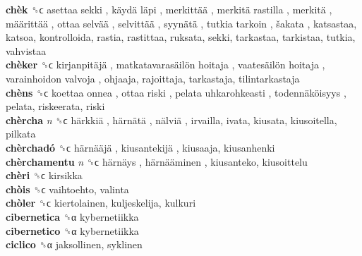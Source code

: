 \textbf{chèk} ␝ϲ   asettaa sekki ,  käydä läpi ,  merkittää ,  merkitä rastilla ,  merkitä ,  määrittää ,  ottaa selvää ,  selvittää ,  syynätä ,  tutkia tarkoin ,  šakata , katsastaa, katsoa, kontrolloida, rastia, rastittaa, ruksata, sekki, tarkastaa, tarkistaa, tutkia, vahvistaa  \\
\textbf{chèker} ␝ϲ   kirjanpitäjä ,  matkatavarasäilön hoitaja ,  vaatesäilön hoitaja ,  varainhoidon valvoja , ohjaaja, rajoittaja, tarkastaja, tilintarkastaja  \\
\textbf{chèns} ␝ϲ   koettaa onnea ,  ottaa riski ,  pelata uhkarohkeasti ,  todennäköisyys , pelata, riskeerata, riski  \\
\textbf{chèrcha} \emph{n}  ␝ϲ   härkkiä ,  härnätä ,  nälviä , irvailla, ivata, kiusata, kiusoitella, pilkata  \\
\textbf{chèrchadó} ␝ϲ   härnääjä ,  kiusantekijä , kiusaaja, kiusanhenki  \\
\textbf{chèrchamentu} \emph{n}  ␝ϲ   härnäys ,  härnääminen , kiusanteko, kiusoittelu  \\
\textbf{chèri} ␝ϲ  kirsikka  \\
\textbf{chòis} ␝ϲ  vaihtoehto, valinta  \\
\textbf{chòler} ␝ϲ  kiertolainen, kuljeskelija, kulkuri  \\
\textbf{cibernetica} ␝α  kybernetiikka  \\
\textbf{cibernetico} ␝α  kybernetiikka  \\
\textbf{ciclico} ␝α  jaksollinen, syklinen  \\
